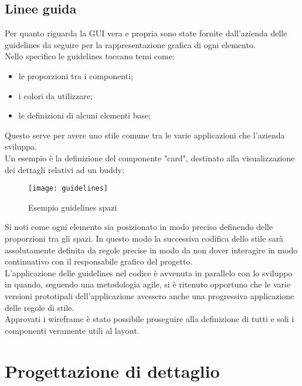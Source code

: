 \subsection{Linee guida}
Per quanto riguarda la GUI vera e propria sono state fornite dall'azienda delle 
guidelines da seguire per la rappresentazione grafica di ogni elemento. \\
Nello specifico le guidelines toccano temi come:
\begin{itemize}
	\item le proporzioni tra i componenti;
	\item i colori da utilizzare;
	\item le definizioni di alcuni elementi base;
\end{itemize}
Questo serve per avere uno stile comune tra le varie applicazioni che 
l'azienda sviluppa. \\
Un esempio è la definizione del componente "card", destinato alla 
visualizzazione dei dettagli relativi ad un buddy:
\begin{figure}[H] 
	\centering
	\texttt{[image: guidelines]}
	\caption{Esempio guidelines spazi}
\end{figure}
Si noti come ogni elemento sia posizionato in modo preciso definendo delle 
proporzioni tra gli spazi. In questo modo la successiva codifica dello stile sarà 
assolutamente definita da regole precise in modo da non dover interagire in modo 
continuativo con il responsabile grafico del progetto. \\
L'applicazione delle guidelines nel codice è avvenuta in parallelo con lo sviluppo 
in quando, seguendo una metodologia agile, si è ritenuto opportuno che le varie 
versioni prototipali dell'applicazione avessero anche una progressiva applicazione 
delle regole di stile.\\
Approvati i wireframe è stato possibile proseguire alla definizione di tutti 
e soli i componenti veramente utili al layout.

\section{Progettazione di dettaglio}
